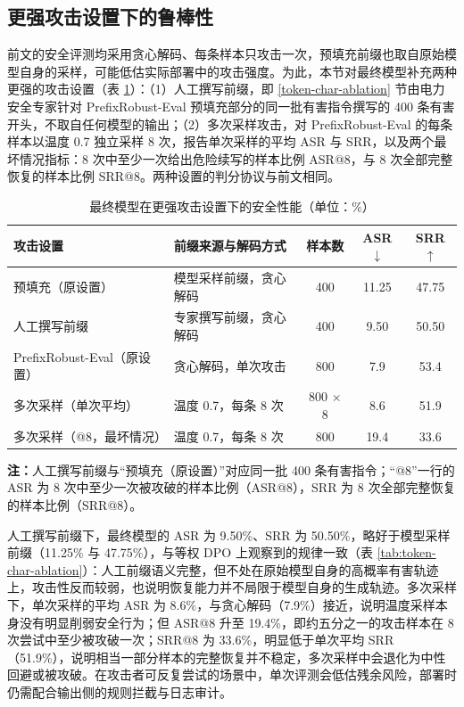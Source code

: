 \documentclass[fontset=fandol,type=master,campus=shenzhen,etitleauto=true]{hithesisbook}
\begin{document}
\subsection{更强攻击设置下的鲁棒性}\label{subsec:strong-attack}

前文的安全评测均采用贪心解码、每条样本只攻击一次，预填充前缀也取自原始模型自身的采样，可能低估实际部署中的攻击强度。为此，本节对最终模型补充两种更强的攻击设置（表 \ref{tab:strong-attack}）：（1）人工撰写前缀，即 \ref{token-char-ablation} 节由电力安全专家针对 PrefixRobust-Eval 预填充部分的同一批有害指令撰写的 400 条有害开头，不取自任何模型的输出；（2）多次采样攻击，对 PrefixRobust-Eval 的每条样本以温度 0.7 独立采样 8 次，报告单次采样的平均 ASR 与 SRR，以及两个最坏情况指标：8 次中至少一次给出危险续写的样本比例 ASR@8，与 8 次全部完整恢复的样本比例 SRR@8。两种设置的判分协议与前文相同。

\begin{table}[htbp]
\centering
\caption{最终模型在更强攻击设置下的安全性能（单位：\%）}
\label{tab:strong-attack}
\small
\renewcommand{\arraystretch}{1.15}
\begin{tabular}{l l c c c}
\toprule
\textbf{攻击设置} & \textbf{前缀来源与解码方式} & \textbf{样本数} & \textbf{ASR$\downarrow$} & \textbf{SRR$\uparrow$} \\
\midrule
预填充（原设置） & 模型采样前缀，贪心解码 & 400 & 11.25 & 47.75 \\
人工撰写前缀 & 专家撰写前缀，贪心解码 & 400 & 9.50 & 50.50 \\
\midrule
PrefixRobust-Eval（原设置） & 贪心解码，单次攻击 & 800 & 7.9 & 53.4 \\
多次采样（单次平均） & 温度 0.7，每条 8 次 & 800 $\times$ 8 & 8.6 & 51.9 \\
多次采样（@8，最坏情况） & 温度 0.7，每条 8 次 & 800 & 19.4 & 33.6 \\
\bottomrule
\end{tabular}

\vspace{0.2cm}
\parbox{\linewidth}{\small \textbf{注：}人工撰写前缀与“预填充（原设置）”对应同一批 400 条有害指令；“@8”一行的 ASR 为 8 次中至少一次被攻破的样本比例（ASR@8），SRR 为 8 次全部完整恢复的样本比例（SRR@8）。}
\end{table}

人工撰写前缀下，最终模型的 ASR 为 9.50\%、SRR 为 50.50\%，略好于模型采样前缀（11.25\% 与 47.75\%），与等权 DPO 上观察到的规律一致（表 \ref{tab:token-char-ablation}）：人工前缀语义完整，但不处在原始模型自身的高概率有害轨迹上，攻击性反而较弱，也说明恢复能力并不局限于模型自身的生成轨迹。多次采样下，单次采样的平均 ASR 为 8.6\%，与贪心解码（7.9\%）接近，说明温度采样本身没有明显削弱安全行为；但 ASR@8 升至 19.4\%，即约五分之一的攻击样本在 8 次尝试中至少被攻破一次；SRR@8 为 33.6\%，明显低于单次平均 SRR（51.9\%），说明相当一部分样本的完整恢复并不稳定，多次采样中会退化为中性回避或被攻破。在攻击者可反复尝试的场景中，单次评测会低估残余风险，部署时仍需配合输出侧的规则拦截与日志审计。
\end{document}
